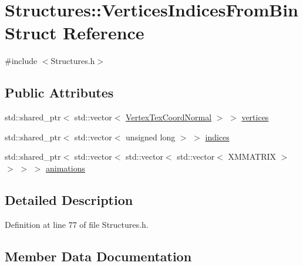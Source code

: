 \hypertarget{struct_structures_1_1_vertices_indices_from_bin}{}\section{Structures\+:\+:Vertices\+Indices\+From\+Bin Struct Reference}
\label{struct_structures_1_1_vertices_indices_from_bin}


{\ttfamily \#include $<$Structures.\+h$>$}

\subsection*{Public Attributes}
\begin{DoxyCompactItemize}
\item 
std\+::shared\+\_\+ptr$<$ std\+::vector$<$ \mbox{\hyperlink{struct_structures_1_1_vertex_tex_coord_normal}{Vertex\+Tex\+Coord\+Normal}} $>$ $>$ \mbox{\hyperlink{struct_structures_1_1_vertices_indices_from_bin_ae08d7d2a23d9103049738339cfe37728}{vertices}}
\item 
std\+::shared\+\_\+ptr$<$ std\+::vector$<$ unsigned long $>$ $>$ \mbox{\hyperlink{struct_structures_1_1_vertices_indices_from_bin_ad211d683156331f097085628242c82a2}{indices}}
\item 
std\+::shared\+\_\+ptr$<$ std\+::vector$<$ std\+::vector$<$ std\+::vector$<$ X\+M\+M\+A\+T\+R\+IX $>$ $>$ $>$ $>$ \mbox{\hyperlink{struct_structures_1_1_vertices_indices_from_bin_ad28bbb8708747a9cbbdca10e22782dae}{animations}}
\end{DoxyCompactItemize}


\subsection{Detailed Description}


Definition at line 77 of file Structures.\+h.



\subsection{Member Data Documentation}
\mbox{\label{struct_structures_1_1_vertices_indices_from_bin_ad28bbb8708747a9cbbdca10e22782dae}} 
